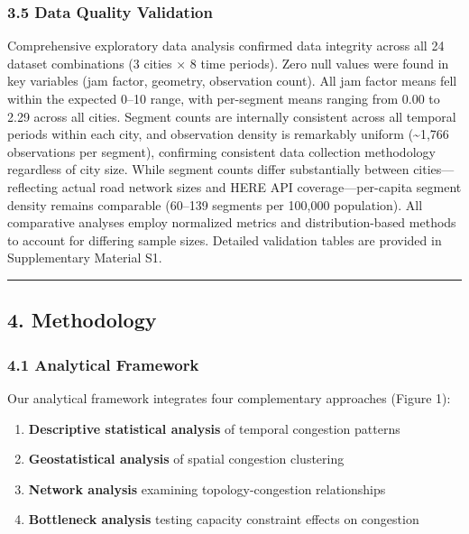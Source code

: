 \documentclass[
  12pt,
]{article}
\providecommand{\tightlist}{%
  \setlength{\itemsep}{0pt}\setlength{\parskip}{0pt}}
\begin{document}
\subsubsection{3.5 Data Quality Validation}\label{data-quality-validation}

Comprehensive exploratory data analysis confirmed data integrity across all 24 dataset combinations (3 cities × 8 time periods). Zero null values were found in key variables (jam factor, geometry, observation count). All jam factor means fell within the expected 0--10 range, with per-segment means ranging from 0.00 to 2.29 across all cities. Segment counts are internally consistent across all temporal periods within each city, and observation density is remarkably uniform (\textasciitilde1,766 observations per segment), confirming consistent data collection methodology regardless of city size. While segment counts differ substantially between cities---reflecting actual road network sizes and HERE API coverage---per-capita segment density remains comparable (60--139 segments per 100,000 population). All comparative analyses employ normalized metrics and distribution-based methods to account for differing sample sizes. Detailed validation tables are provided in Supplementary Material S1.

\begin{center}\rule{0.5\linewidth}{0.5pt}\end{center}

\subsection{4. Methodology}\label{methodology}

\subsubsection{4.1 Analytical Framework}\label{analytical-framework}

Our analytical framework integrates four complementary approaches (Figure 1):

\begin{enumerate}
\def\labelenumi{\arabic{enumi}.}
\tightlist
\item
  \textbf{Descriptive statistical analysis} of temporal congestion patterns
\item
  \textbf{Geostatistical analysis} of spatial congestion clustering
\item
  \textbf{Network analysis} examining topology-congestion relationships
\item
  \textbf{Bottleneck analysis} testing capacity constraint effects on congestion
\end{enumerate}
\end{document}
